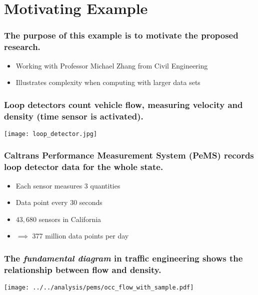 \documentclass{beamer}
\begin{document}
\section{Motivating Example}
\begin{frame}

    \frametitle{The purpose of this example is to motivate the proposed
    research.}

    \begin{itemize}
        \item Working with Professor Michael Zhang from Civil Engineering
        \item Illustrates complexity when computing with larger data sets
    \end{itemize}

\end{frame}
\begin{frame}

    \frametitle{Loop detectors count vehicle flow, measuring velocity and
    density (time sensor is activated).}

\centerline{\texttt{[image: loop\_detector.jpg]}}

\end{frame}
\begin{frame}

\frametitle{Caltrans Performance Measurement System (PeMS) records loop
    detector
data for the whole state.}

    \begin{itemize}
        \item Each sensor measures 3 quantities
        \item Data point every 30 seconds
        \item $43,680$ sensors in California
        \item $\implies$  377 million data points per day
    \end{itemize}

\end{frame}
\begin{frame}

    \frametitle{The \emph{fundamental diagram} in traffic engineering shows
        the relationship between flow and density.}

    \centerline{\texttt{[image: ../../analysis/pems/occ\_flow\_with\_sample.pdf]}}

\end{frame}
\end{document}
